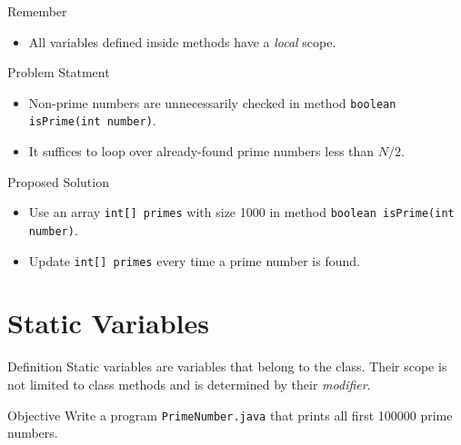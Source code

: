 \documentclass[10pt, compress]{beamer}
\begin{document}
\begin{slide}
	\begin{block}{Remember}
		\begin{itemize}
			\item[] All variables defined inside methods have a \emph{local} scope.
		\end{itemize}
	\end{block}
\end{slide}

\begin{slide}
	\begin{block}{Problem Statment}
		\begin{itemize}
			\item[] Non-prime numbers are unnecessarily checked in method \texttt{boolean isPrime(int number)}.
			\item[] It suffices to loop over already-found prime numbers less than $N / 2$.
		\end{itemize}
	\end{block}
	\begin{block}{Proposed Solution}
		\begin{itemize}
			\item[] Use an array \texttt{int[] primes} with size 1000 in method \texttt{boolean isPrime(int number)}.
			\item[] Update \texttt{int[] primes} every time a prime number is found.
		\end{itemize}
	\end{block}
\end{slide}

\section{Static Variables}

\begin{slide}
	\begin{block}{Definition}
		Static variables are variables that belong to the class.
		Their scope is not limited to class methods and is determined by their \textit{modifier}.
	\end{block}
\end{slide}

\begin{slide}
	\begin{block}{Objective}
		Write a program \texttt{PrimeNumber.java} that prints all first 100000 prime numbers.
	\end{block}
\end{slide}
\end{document}
